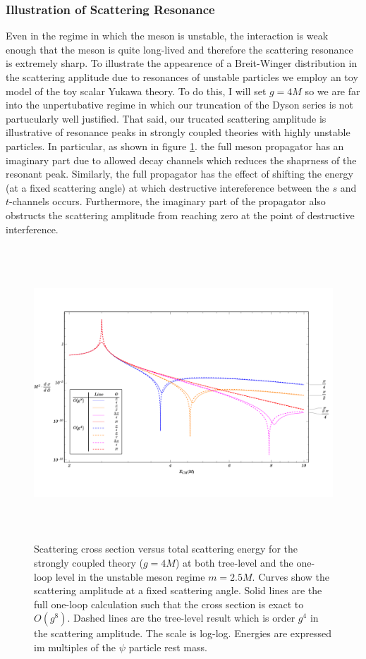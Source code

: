 \documentclass{article}
\begin{document}
\subsubsection{Illustration of Scattering Resonance}
Even in the regime in which the meson is unstable, the interaction is weak enough that the meson is quite long-lived and therefore the scattering resonance is extremely sharp. To illustrate the appearence of a Breit-Winger distribution in the scattering applitude due to resonances of unstable particles we employ an toy model of the toy scalar Yukawa theory. To do this, I will set $g = 4 M$ so we are far into the unpertubative regime in which our truncation of the Dyson series is not partucularly well justified. That said, our trucated scattering amplitude is illustrative of resonance peaks in strongly coupled theories with highly unstable particles. In particular, as shown in figure \ref{Ill}. the full meson propagator has an imaginary part due to allowed decay channels which reduces the shaprness of the resonant peak. Similarly, the full propagator has the effect of shifting the energy (at a fixed scattering angle) at which destructive intereference between the $s$ and $t$-channels occurs. Furthermore, the imaginary part of the propagator also obstructs the scattering amplitude from reaching zero at the point of destructive interference.     
\begin{figure}
\begin{center}
\includegraphics[width=15cm, height=11cm]{UnStableMeson-Illustration}
\caption{Scattering cross section versus total scattering energy for the strongly coupled theory ($g = 4 M$) at both tree-level and the one-loop level in the unstable meson regime $m = 2.5 M$. Curves show the scattering amplitude at a fixed scattering angle. Solid lines are the full one-loop calculation such that the cross section is exact to $O(g^8)$. Dashed lines are the tree-level result which is order $g^4$ in the scattering amplitude. The scale is log-log. Energies are expressed im multiples of the $\psi$ particle rest mass.} 
\label{Ill}
\end{center}
\end{figure}
\end{document}
